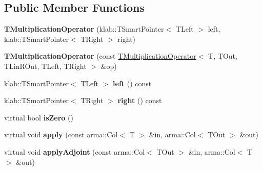\subsection*{Public Member Functions}
\begin{DoxyCompactItemize}
\item 
{\bfseries T\+Multiplication\+Operator} (klab\+::\+T\+Smart\+Pointer$<$ T\+Left $>$ left, klab\+::\+T\+Smart\+Pointer$<$ T\+Right $>$ right)\hypertarget{classkl1p_1_1TMultiplicationOperator_af241493adeefc277bf7ba609577f463c}{}\label{classkl1p_1_1TMultiplicationOperator_af241493adeefc277bf7ba609577f463c}

\item 
{\bfseries T\+Multiplication\+Operator} (const \hyperlink{classkl1p_1_1TMultiplicationOperator}{T\+Multiplication\+Operator}$<$ T, T\+Out, T\+Lin\+R\+Out, T\+Left, T\+Right $>$ \&op)\hypertarget{classkl1p_1_1TMultiplicationOperator_a6ef032cbac0c3be9e83f6f6d0de3e77d}{}\label{classkl1p_1_1TMultiplicationOperator_a6ef032cbac0c3be9e83f6f6d0de3e77d}

\item 
klab\+::\+T\+Smart\+Pointer$<$ T\+Left $>$ {\bfseries left} () const \hypertarget{classkl1p_1_1TMultiplicationOperator_a82e03600cbb956f5cace5dc1cc868f24}{}\label{classkl1p_1_1TMultiplicationOperator_a82e03600cbb956f5cace5dc1cc868f24}

\item 
klab\+::\+T\+Smart\+Pointer$<$ T\+Right $>$ {\bfseries right} () const \hypertarget{classkl1p_1_1TMultiplicationOperator_a14d05842ed19e3fc3a488072e63da64a}{}\label{classkl1p_1_1TMultiplicationOperator_a14d05842ed19e3fc3a488072e63da64a}

\item 
virtual bool {\bfseries is\+Zero} ()\hypertarget{classkl1p_1_1TMultiplicationOperator_ae1a8d4bbb92e4da77f5ec3113f3ddf71}{}\label{classkl1p_1_1TMultiplicationOperator_ae1a8d4bbb92e4da77f5ec3113f3ddf71}

\item 
virtual void {\bfseries apply} (const arma\+::\+Col$<$ T $>$ \&in, arma\+::\+Col$<$ T\+Out $>$ \&out)\hypertarget{classkl1p_1_1TMultiplicationOperator_adebe12d7e04594fee0ee9ffd5fe510bc}{}\label{classkl1p_1_1TMultiplicationOperator_adebe12d7e04594fee0ee9ffd5fe510bc}

\item 
virtual void {\bfseries apply\+Adjoint} (const arma\+::\+Col$<$ T\+Out $>$ \&in, arma\+::\+Col$<$ T $>$ \&out)\hypertarget{classkl1p_1_1TMultiplicationOperator_a950e2b614cc8c3992d67b239ef6cb1dd}{}\label{classkl1p_1_1TMultiplicationOperator_a950e2b614cc8c3992d67b239ef6cb1dd}


\end{DoxyCompactItemize}

